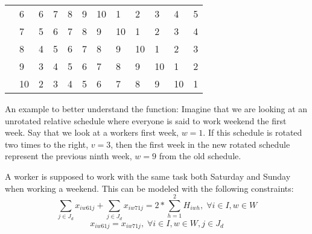 \begin{table}[H]
\begin{tabular}{llllllllllll}
    & \multicolumn{1}{l|}{6}  & \multicolumn{1}{l|}{6}  & \multicolumn{1}{l|}{7}  & \multicolumn{1}{l|}{8}  & \multicolumn{1}{l|}{9}  & \multicolumn{1}{l|}{10} & \multicolumn{1}{l|}{1}  & \multicolumn{1}{l|}{2}  & \multicolumn{1}{l|}{3}  & \multicolumn{1}{l|}{4}  & \multicolumn{1}{l|}{5}  \\ \cline{3-12} 
    & \multicolumn{1}{l|}{7}  & \multicolumn{1}{l|}{5}  & \multicolumn{1}{l|}{6}  & \multicolumn{1}{l|}{7}  & \multicolumn{1}{l|}{8}  & \multicolumn{1}{l|}{9}  & \multicolumn{1}{l|}{10} & \multicolumn{1}{l|}{1}  & \multicolumn{1}{l|}{2}  & \multicolumn{1}{l|}{3}  & \multicolumn{1}{l|}{4}  \\ \cline{3-12} 
    & \multicolumn{1}{l|}{8}  & \multicolumn{1}{l|}{4}  & \multicolumn{1}{l|}{5}  & \multicolumn{1}{l|}{6}  & \multicolumn{1}{l|}{7}  & \multicolumn{1}{l|}{8}  & \multicolumn{1}{l|}{9}  & \multicolumn{1}{l|}{10} & \multicolumn{1}{l|}{1}  & \multicolumn{1}{l|}{2}  & \multicolumn{1}{l|}{3}  \\ \cline{3-12} 
    & \multicolumn{1}{l|}{9}  & \multicolumn{1}{l|}{3}  & \multicolumn{1}{l|}{4}  & \multicolumn{1}{l|}{5}  & \multicolumn{1}{l|}{6}  & \multicolumn{1}{l|}{7}  & \multicolumn{1}{l|}{8}  & \multicolumn{1}{l|}{9}  & \multicolumn{1}{l|}{10} & \multicolumn{1}{l|}{1}  & \multicolumn{1}{l|}{2}  \\ \cline{3-12} 
    & \multicolumn{1}{l|}{10} & \multicolumn{1}{l|}{2}  & \multicolumn{1}{l|}{3}  & \multicolumn{1}{l|}{4}  & \multicolumn{1}{l|}{5}  & \multicolumn{1}{l|}{6}  & \multicolumn{1}{l|}{7}  & \multicolumn{1}{l|}{8}  & \multicolumn{1}{l|}{9}  & \multicolumn{1}{l|}{10} & \multicolumn{1}{l|}{1}  \\ \cline{3-12} 
\end{tabular}
\end{table}
An example to better understand the function: Imagine that we are looking at an unrotated relative schedule where everyone is said to work weekend the first week. Say that we look at a workers first week, $w=1$. If this schedule is rotated two times to the right, $v=3$, then the first week in the new rotated schedule represent the previous ninth week, $w=9$ from the old schedule.

A worker is supposed to work with the same task both Saturday and Sunday when working a weekend. This can be modeled with the following constraints:
\begin{equation} \label{constr:consecutive_days}
\sum_{j \in J_d} x_{iw61j} + \sum_{j \in J_d} x_{iw71j} = 2*\sum_{h = 1}^{2} H_{iwh}, \; \forall i\in I, w \in W
\end{equation}
\begin{equation} \label{constr:same_tasks}
x_{iw61j} = x_{iw71j}, \; \forall i\in I, w \in W, j \in J_d
\end{equation}

